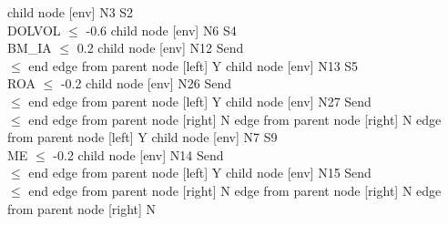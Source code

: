       child { node [env] {N3  S2 \\ DOLVOL $\leq$ -0.6} 
            child { node [env] {N6  S4 \\ BM_IA $\leq$ 0.2} 
                  child { node [env] {N12  Send \\  $\leq$ end} 
                        edge from parent node [left] {Y} 
                  }
                  child { node [env] {N13  S5 \\ ROA $\leq$ -0.2} 
                        child { node [env] {N26  Send \\  $\leq$ end} 
                              edge from parent node [left] {Y} 
                        }
                        child { node [env] {N27  Send \\  $\leq$ end} 
                              edge from parent node [right] {N} 
                        }
                        edge from parent node [right] {N} 
                  }
                  edge from parent node [left] {Y} 
            }
            child { node [env] {N7  S9 \\ ME $\leq$ -0.2} 
                  child { node [env] {N14  Send \\  $\leq$ end} 
                        edge from parent node [left] {Y} 
                  }
                  child { node [env] {N15  Send \\  $\leq$ end} 
                        edge from parent node [right] {N} 
                  }
                  edge from parent node [right] {N} 
            }
            edge from parent node [right] {N} 
      }

